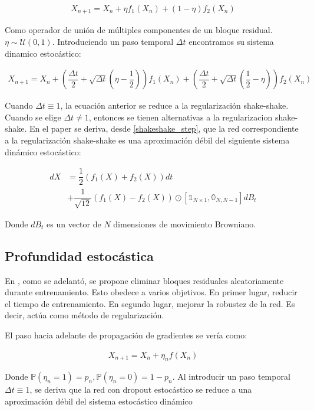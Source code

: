 \documentclass[titlepage,a4paper,oneside]{article}
\begin{document}
\begin{align}
	X_{n+1} = X_n + \eta f_1(X_n) + (1-\eta) f_2 (X_n)
\end{align}

Como operador de unión de múltiples componentes de un bloque residual. $\eta \sim \mathscr{U}(0,1)$. Introduciendo un paso temporal $\Delta t$ encontramos su sistema dinamico estocástico:

\begin{align}\label{shakeshake_step}
	X_{n+1} = X_n + \left(\dfrac{\Delta t}{2} + \sqrt{\Delta t}(\eta - \dfrac{1}{2})\right) f_1(X_n) + \left( \dfrac{\Delta t}{2} + \sqrt{\Delta t} (\dfrac{1}{2} - \eta) \right) f_2(X_n)
\end{align}

Cuando $\Delta t \equiv 1$, la ecuación anterior se reduce a la regularización shake-shake. Cuando se elige $\Delta t \neq 1$, entonces se tienen alternativas a la regularizacion shake-shake. En el paper se deriva, desde \ref{shakeshake_step}, que la red correspondiente a la regularización shake-shake es una aproximación débil del siguiente sistema dinámico estocástico:

\begin{align}
	dX &= \dfrac{1}{2} (f_1(X) + f_2(X)) dt\\
	   &+ \dfrac{1}{\sqrt{12}} (f_1(X) - f_2(X)) \odot \left[ \mathbb{1}_{N\times 1}, \mathbb{0}_{N,N-1} \right] dB_t
\end{align}

Donde $dB_t$ es un vector de $N$ dimensiones de movimiento Browniano.

\subsection{Profundidad estocástica}
En \cite{huang2016deep}, como se adelantó, se propone eliminar bloques residuales aleatoriamente durante entrenamiento. Esto obedece a varios objetivos. En primer lugar, reducir el tiempo de entrenamiento. En segundo lugar, mejorar la robustez de la red. Es decir, actúa como método de regularización.

El paso hacia adelante de propagación de gradientes se vería como:

\begin{align}
	X_{n+1} = X_n + \eta_n f(X_n)
\end{align}

Donde $\mathbb{P}(\eta_n = 1) = p_n, \mathbb{P}(\eta_n = 0) = 1 - p_n$. Al introducir un paso temporal $\Delta t \equiv 1$, se deriva que la red con dropout estocástico se reduce a una aproximación débil del sistema estocástico dinámico
\end{document}
